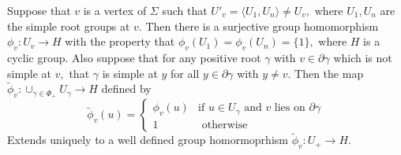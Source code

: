 \documentclass[class=book, crop=false,12 pt]{standalone}
\begin{document}
\begin{lemma}
	\label{lem:existence}
	Suppose that $v$ is a vertex of $\Sigma$ such that $U'_v=\langle U_1,U_n\rangle\neq U_v,$ where $U_1,U_n$ are the simple root groups at $v.$ Then there is a surjective group homomorphism $\phi_v:U_v\to H$ with the property that $\phi_v(U_1)=\phi_v(U_n)=\{1\},$ where $H$ is a cyclic group. Also suppose that for any positive root $\gamma$ with $v\in \partial \gamma$ which is not simple at $v,$ that $\gamma$ is simple at $y$ for all $y\in \partial \gamma$ with $y\neq v.$ Then the map $\tilde{\phi}_v:\cup_{\gamma\in \Phi_+}U_\gamma\to H$ defined by
\[
	\tilde{\phi}_v(u)=\begin{cases} \phi_v(u)&\text{if }u\in U_\gamma\text{ and }v\text{ lies on }\partial\gamma\\
		1&\text{ otherwise}
	\end{cases}
\]
Extends uniquely to a well defined group homormoprhism $\tilde{\phi}_v:U_+\to H.$
\end{lemma}
\end{document}
